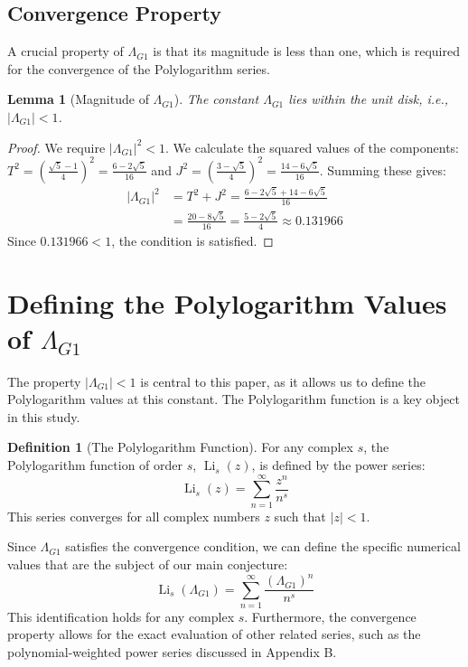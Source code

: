 \documentclass{amsart}
\theoremstyle{plain}
\newtheorem{lemma}[theorem]{Lemma}
\theoremstyle{definition}
\newtheorem{definition}[theorem]{Definition}
\theoremstyle{remark}
\DeclareMathOperator{\Li}{Li} %
\newcommand{\LambdaG}{\Lambda_{G1}}
\begin{document}
\subsection{Convergence Property}
A crucial property of $\LambdaG$ is that its magnitude is less than one, which is required for the convergence of the Polylogarithm series.
\begin{lemma}[Magnitude of $\LambdaG$]
\label{lem:convergence}
The constant $\LambdaG$ lies within the unit disk, i.e., $|\LambdaG| < 1$.
\end{lemma}
\begin{proof}
We require $|\LambdaG|^2 < 1$. We calculate the squared values of the components: $T^2 = \left(\frac{\sqrt{5}-1}{4}\right)^2 = \frac{6-2\sqrt{5}}{16}$ and $J^2 = \left(\frac{3-\sqrt{5}}{4}\right)^2 = \frac{14-6\sqrt{5}}{16}$. Summing these gives:
\begin{align*}
    |\LambdaG|^2 &= T^2+J^2 = \frac{6-2\sqrt{5} + 14-6\sqrt{5}}{16} \\
                 &= \frac{20-8\sqrt{5}}{16} = \frac{5-2\sqrt{5}}{4} \approx 0.131966
\end{align*}
Since $0.131966 < 1$, the condition is satisfied.
\qedhere
\end{proof}

\section{Defining the Polylogarithm Values of \texorpdfstring{$\LambdaG$}{Lambda\_G1}}
The property $|\LambdaG| < 1$ is central to this paper, as it allows us to define the Polylogarithm values at this constant. The Polylogarithm function is a key object in this study.
\begin{definition}[The Polylogarithm Function]
For any complex $s$, the Polylogarithm function of order $s$, $\Li_s(z)$, is defined by the power series:
$$ \Li_s(z) = \sum_{n=1}^{\infty} \frac{z^n}{n^s} $$
This series converges for all complex numbers $z$ such that $|z|<1$.
\end{definition}

Since $\LambdaG$ satisfies the convergence condition, we can define the specific numerical values that are the subject of our main conjecture:
$$ \Li_s(\LambdaG) = \sum_{n=1}^{\infty} \frac{(\LambdaG)^{n}}{n^s} $$
This identification holds for any complex $s$. Furthermore, the convergence property allows for the exact evaluation of other related series, such as the polynomial-weighted power series discussed in Appendix B.
\end{document}
